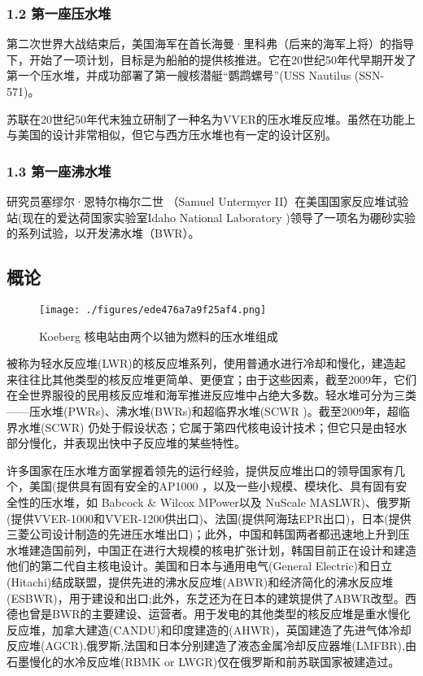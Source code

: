 \subsubsection{1.2 第一座压水堆}
第二次世界大战结束后，美国海军在首长海曼·里科弗（后来的海军上将）的指导下，开始了一项计划，目标是为船舶的提供核推进。它在20世纪50年代早期开发了第一个压水堆，并成功部署了第一艘核潜艇“鹦鹉螺号”(USS Nautilus (SSN-571)。

苏联在20世纪50年代末独立研制了一种名为VVER的压水堆反应堆。虽然在功能上与美国的设计非常相似，但它与西方压水堆也有一定的设计区别。

\subsubsection{1.3 第一座沸水堆}
研究员塞缪尔·恩特尔梅尔二世 （Samuel Untermyer II）在美国国家反应堆试验站(现在的爱达荷国家实验室Idaho National Laboratory )领导了一项名为硼砂实验的系列试验，以开发沸水堆（BWR）。

\subsection{概论}
\begin{figure}[ht]
\centering
\texttt{[image: ./figures/ede476a7a9f25af4.png]}
\caption{Koeberg 核电站由两个以铀为燃料的压水堆组成} \label{fig_QSFYD_1}
\end{figure}
被称为轻水反应堆(LWR)的核反应堆系列，使用普通水进行冷却和慢化，建造起来往往比其他类型的核反应堆更简单、更便宜；由于这些因素，截至2009年，它们在全世界服役的民用核反应堆和海军推进反应堆中占绝大多数。轻水堆可分为三类——压水堆(PWRs)、沸水堆(BWRs)和超临界水堆(SCWR )。截至2009年，超临界水堆(SCWR) 仍处于假设状态；它属于第四代核电设计技术；但它只是由轻水部分慢化，并表现出快中子反应堆的某些特性。

许多国家在压水堆方面掌握着领先的运行经验，提供反应堆出口的领导国家有几个，美国(提供具有固有安全的AP1000 ，以及一些小规模、模块化、具有固有安全性的压水堆，如 Babcock & Wilcox MPower以及 NuScale MASLWR)、俄罗斯(提供VVER-1000和VVER-1200供出口)、法国(提供阿海珐EPR出口)，日本(提供三菱公司设计制造的先进压水堆出口)；此外，中国和韩国两者都迅速地上升到压水堆建造国前列，中国正在进行大规模的核电扩张计划，韩国目前正在设计和建造他们的第二代自主核电设计。美国和日本与通用电气(General Electric)和日立(Hitachi)结成联盟，提供先进的沸水反应堆(ABWR)和经济简化的沸水反应堆(ESBWR)，用于建设和出口;此外，东芝还为在日本的建筑提供了ABWR改型。西德也曾是BWR的主要建设、运营者。用于发电的其他类型的核反应堆是重水慢化反应堆，加拿大建造(CANDU)和印度建造的(AHWR)，英国建造了先进气体冷却反应堆(AGCR),俄罗斯,法国和日本分别建造了液态金属冷却反应器堆(LMFBR),由石墨慢化的水冷反应堆(RBMK or LWGR)仅在俄罗斯和前苏联国家被建造过。

